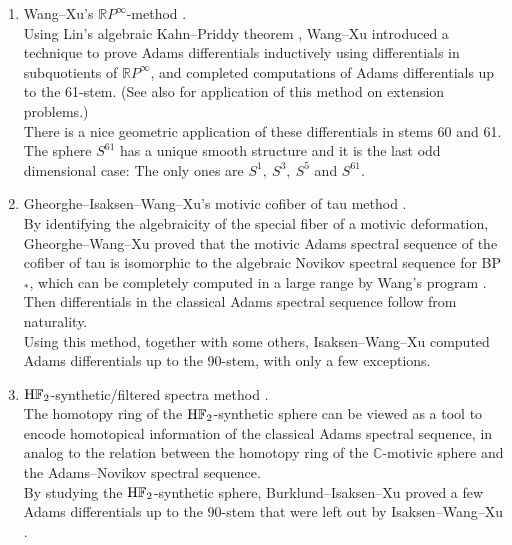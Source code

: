 \documentclass{amsart}
\numberwithin{equation}{section}
\newcommand{\HF}{\mathrm{H}\bF_2}
\begin{document}
\begin{enumerate}
    \item Wang--Xu's $\mathbb{R}P^\infty$-method \cite{WX61}.\\

    \noindent Using Lin's algebraic Kahn--Priddy theorem \cite{LinalgKP}, Wang--Xu introduced a technique to prove Adams differentials inductively using differentials in subquotients of $\mathbb{R}P^\infty$, and completed computations of Adams differentials up to the 61-stem. (See also \cite{WangXu51ext} for application of this method on extension problems.) \\

    \noindent There is a nice geometric application of these differentials in stems 60 and 61. The sphere $S^{61}$ has a unique smooth structure and it is the last odd dimensional case: The only ones are $S^1, \ S^3, \ S^5$ and $S^{61}$.\\

    \item Gheorghe--Isaksen--Wang--Xu's motivic cofiber of tau method \cite{GWX, IWX}. \\

    \noindent By identifying the algebraicity of the special fiber of a motivic deformation, Gheorghe--Wang--Xu \cite{GWX} proved that the motivic Adams spectral sequence of the cofiber of tau is isomorphic to the algebraic Novikov spectral sequence for BP$_*$, which can be completely computed in a large range by Wang's program \cite{Wang}. Then differentials in the classical Adams spectral sequence follow from naturality.\\ 
    
    \noindent Using this method, together with some others, Isaksen--Wang--Xu \cite{IWX} computed Adams differentials up to the 90-stem, with only a few exceptions. \\

    \item $\HF$-synthetic/filtered spectra method \cite{Pst, Burklund, BurklundXu, BurklundIsaksenXu}.\\

    \noindent The homotopy ring of the $\HF$-synthetic sphere \cite{Pst, BHS} can be viewed as a tool to encode homotopical information of the classical Adams spectral sequence, in analog to the relation between the homotopy ring of the $\mathbb{C}$-motivic sphere \cite{Isaksen} and the Adams--Novikov spectral sequence. \\

    \noindent By studying the $\HF$-synthetic sphere, Burklund--Isaksen--Xu \cite{BurklundIsaksenXu} proved a few Adams differentials up to the 90-stem that were left out by Isaksen--Wang--Xu \cite{IWX}.\\

    
\end{enumerate}
\end{document}
